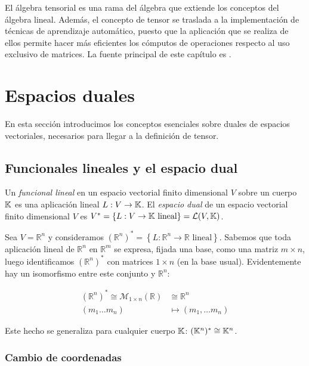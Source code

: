 El álgebra tensorial es una rama del álgebra que extiende los conceptos del álgebra lineal. Además, el concepto de tensor se traslada a la implementación de técnicas de aprendizaje automático, puesto que la aplicación que se realiza de ellos permite hacer más eficientes los cómputos de operaciones respecto al uso exclusivo de matrices.
La fuente principal de este capítulo es \textcite[capítulo 8]{treil2013}.

\section{Espacios duales}\label{espacios-duales}

En esta sección introducimos los conceptos esenciales sobre duales de espacios vectoriales, necesarios para llegar a la definición de tensor.

\subsection{Funcionales lineales y el espacio
dual}\label{funcionales-lineales-y-el-espacio-dual}

Un \emph{funcional lineal} en un espacio vectorial finito dimensional
\(V\) sobre un cuerpo \(\mathbb{K}\) es una aplicación lineal
\(L:V\rightarrow \mathbb{K}\). 
{}
El \emph{espacio dual} de un espacio vectorial finito dimensional
\(V\) es \(V^*=\{L:V\rightarrow \mathbb{K}\text{ lineal}\}=\mathcal{L}(V, \mathbb{K})\).

\exampleb
Sea \(V=\mathbb R^n\) y consideramos
\((\mathbb R^n)^*=\left\{L:\mathbb R^n\rightarrow\mathbb R\text{ lineal}\right\}\).
Sabemos que toda aplicación lineal de \(\mathbb{R}^{n}\) en
\(\mathbb{R}^{m}\) se expresa, fijada una base, como una matriz
\(m\times n\), luego identificamos \((\mathbb{R}^{n})^{*}\) con matrices
\(1\times n\) (en la base usual). Evidentemente hay un isomorfismo entre
este conjunto y \(\mathbb{R}^{n}\):

\begin{align*}
  (\mathbb{R}^{n})^{*} \cong \mathcal{M}_{1\times n}(\mathbb{R})&\cong \mathbb{R}^{n} \\
  (m_{1} \dots m_{n}) &\mapsto (m_{1}, \dots m_{n})
\end{align*}

Este hecho se generaliza para cualquier cuerpo \(\mathbb{K}\):
\((\mathbb{K}^{n})^{*}\cong \mathbb{K}^{n}\). \examplee

\subsubsection{Cambio de coordenadas}\label{cambio-de-coordenadas}

